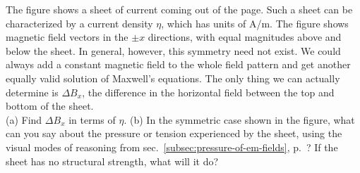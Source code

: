 The figure shows a sheet of current coming out of the page. Such a sheet can be characterized by a current density $\eta$, which has
units of A/m. The figure shows magnetic field vectors in the $\pm x$ directions, with equal magnitudes above and below the sheet.
In general, however, this symmetry need not exist.
We could always add a constant magnetic field to the whole field pattern and get another equally valid solution
of Maxwell's equations. The only thing we can actually determine is $\Delta B_x$, the difference in the horizontal field between the
top and bottom of the sheet.\\
(a) Find $\Delta B_x$ in terms of $\eta$.\answercheck\hwendpart
(b) In the symmetric case shown in the figure,
what can you say about the pressure or tension experienced by the sheet, using the visual modes of reasoning
from sec.~\ref{subsec:pressure-of-em-fields}, p.~\pageref{subsec:pressure-of-em-fields}? If the sheet has no
structural strength, what will it do?
